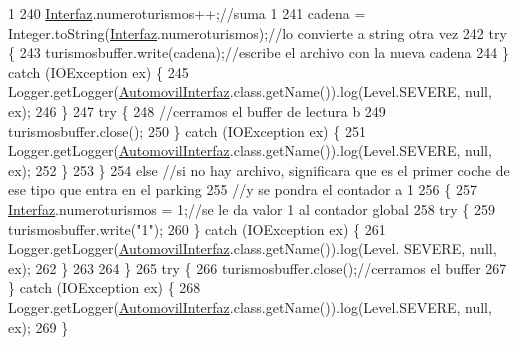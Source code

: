 \begin{DoxyCode}
{       1}
240                 \mbox{\hyperlink{namespace_interfaz}{Interfaz}}.numeroturismos++;\textcolor{comment}{//suma 1}
241                 cadena = Integer.toString(\mbox{\hyperlink{namespace_interfaz}{Interfaz}}.numeroturismos);\textcolor{comment}{//lo convierte a string otra vez}
242                 \textcolor{keywordflow}{try} \{
243                     turismosbuffer.write(cadena);\textcolor{comment}{//escribe el archivo con la nueva cadena}
244                 \} \textcolor{keywordflow}{catch} (IOException ex) \{
245                     Logger.getLogger(\mbox{\hyperlink{classejercicio2_1_1_automovil_interfaz_a0ebeee030ec43693c371da3b68222644}{AutomovilInterfaz}}.class.getName()).log(Level.SEVERE, 
      null, ex);
246                 \}
247                 \textcolor{keywordflow}{try} \{
248                     \textcolor{comment}{//cerramos el buffer de lectura b}
249                     turismosbuffer.close();
250                 \} \textcolor{keywordflow}{catch} (IOException ex) \{
251                     Logger.getLogger(\mbox{\hyperlink{classejercicio2_1_1_automovil_interfaz_a0ebeee030ec43693c371da3b68222644}{AutomovilInterfaz}}.class.getName()).log(Level.SEVERE, 
      null, ex);
252                 \}
253             \}
254             \textcolor{keywordflow}{else}    \textcolor{comment}{//si no hay archivo, significara que es el primer coche de ese tipo que entra en el
       parking}
255                     \textcolor{comment}{//y se pondra el contador a 1}
256             \{
257                 \mbox{\hyperlink{namespace_interfaz}{Interfaz}}.numeroturismos = 1;\textcolor{comment}{//se le da valor 1 al contador global}
258                     \textcolor{keywordflow}{try} \{
259                         turismosbuffer.write(\textcolor{stringliteral}{"1"});
260                     \} \textcolor{keywordflow}{catch} (IOException ex) \{
261                         Logger.getLogger(\mbox{\hyperlink{classejercicio2_1_1_automovil_interfaz_a0ebeee030ec43693c371da3b68222644}{AutomovilInterfaz}}.class.getName()).log(Level.
      SEVERE, null, ex);
262                     \}
263                 
264             \}
265                 \textcolor{keywordflow}{try} \{
266                     turismosbuffer.close();\textcolor{comment}{//cerramos el buffer}
267                 \} \textcolor{keywordflow}{catch} (IOException ex) \{
268                     Logger.getLogger(\mbox{\hyperlink{classejercicio2_1_1_automovil_interfaz_a0ebeee030ec43693c371da3b68222644}{AutomovilInterfaz}}.class.getName()).log(Level.SEVERE, 
      null, ex);
269                 \}

\end{DoxyCode}
